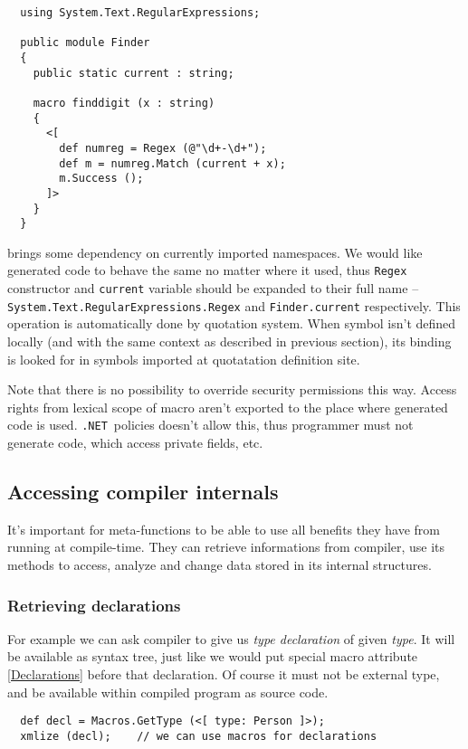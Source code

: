 \documentclass{llncs}
\newcommand{\net}[0]{{\tt .NET}}
\begin{document}
\begin{verbatim}
  using System.Text.RegularExpressions;

  public module Finder 
  {
    public static current : string;

    macro finddigit (x : string)
    {
      <[ 
        def numreg = Regex (@"\d+-\d+");
        def m = numreg.Match (current + x);
        m.Success ();
      ]>
    }
  }
\end{verbatim} %

brings some dependency on currently imported namespaces. We would like
generated code to behave the same no matter where it used, thus 
\verb,Regex, constructor and \verb,current, variable should be expanded to
their full name -- \verb,System.Text.RegularExpressions.Regex,
and \verb,Finder.current, respectively. This operation is automatically
done by quotation system. When symbol isn't defined locally (and with the same 
context as described in previous section), its binding is looked for in symbols
imported at quotatation definition site.

Note that there is no possibility to override security permissions this
way. Access rights from lexical scope of macro aren't exported to the place
where generated code is used. \net\ policies doesn't allow this, thus
programmer must not generate code, which access private fields, etc.

\subsection{Accessing compiler internals}
It's important for meta-functions to be able to use all benefits they have
from running at compile-time. They can retrieve informations from
compiler, use its methods to access, analyze and change data stored
in its internal structures. 

\subsubsection{Retrieving declarations}
For example we can ask compiler to give us \emph{type declaration} of
given \emph{type}. It will be available as syntax tree, just like we
would put special macro attribute \ref{Declarations} before that declaration.
Of course it must not be external type, and be available within compiled 
program as source code.

\begin{verbatim}
  def decl = Macros.GetType (<[ type: Person ]>);
  xmlize (decl);    // we can use macros for declarations
\end{verbatim}
\end{document}
